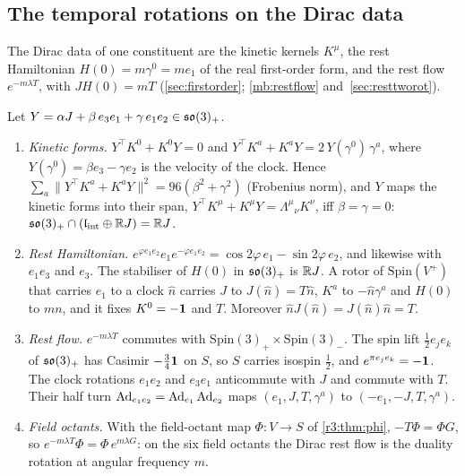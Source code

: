 \subsection{The temporal rotations on the Dirac data}
\label{e6:sec:dirac}

The Dirac data of one constituent are the kinetic kernels $K^\mu$, the rest Hamiltonian $H(0)=m\gamma^0=me_1$ of the real first-order form,
and the rest flow $e^{-m\lambda T}$, with $JH(0)=mT$ (\cref{sec:firstorder}; \cref{mb:restflow} and~\cref{sec:resttworot}).

\begin{proposition}
\label{e6:prop:dirac}
Let $Y=\alpha J+\beta\,e_3e_1+\gamma\,e_1e_2\in\mathfrak{so}(3)_+$.
\begin{enumerate}[label=(\roman*),leftmargin=2.2em]
\item \emph{Kinetic forms.} $Y^{\!\top}K^0+K^0Y=0$ and $Y^{\!\top}K^a+K^aY=2\,Y(\gamma^0)\,\gamma^a$, where $Y(\gamma^0)=\beta e_3-\gamma e_2$ is the velocity
of the clock. Hence $\sum_a\|Y^{\!\top}K^a+K^aY\|^2=96(\beta^2+\gamma^2)$ (Frobenius norm), and $Y$ maps the kinetic forms into their span,
$Y^{\!\top}K^\mu+K^\mu Y=\Lambda^\mu{}_\nu K^\nu$, iff $\beta=\gamma=0$: $\mathfrak{so}(3)_+\cap(\mathfrak l_{\rm int}\oplus\mathbb{R} J)=\mathbb{R} J$.
\item \emph{Rest Hamiltonian.} $e^{\varphi e_1e_2}e_1e^{-\varphi e_1e_2}=\cos2\varphi\,e_1-\sin2\varphi\,e_2$, and likewise with $e_1e_3$ and $e_3$. The stabiliser of
$H(0)$ in $\mathfrak{so}(3)_+$ is $\mathbb{R} J$. A rotor of $\mathrm{Spin}(V^+)$ that carries $e_1$ to a clock $\hat n$ carries $J$ to $J(\hat n)=T\hat n$, $K^a$ to $-\hat n\gamma^a$ and
$H(0)$ to $mn$, and it fixes $K^0=-\mathbf 1$ and $T$. Moreover $\hat nJ(\hat n)=J(\hat n)\hat n=T$.
\item \emph{Rest flow.} $e^{-m\lambda T}$ commutes with $\mathrm{Spin}(3)_+\times\mathrm{Spin}(3)_-$. The spin lift $\tfrac12e_je_k$ of $\mathfrak{so}(3)_+$ has Casimir
$-\tfrac34\mathbf 1$ on $S$, so $S$ carries isospin $\tfrac12$, and $e^{\pi e_je_k}=-\mathbf 1$. The clock rotations $e_1e_2$ and $e_3e_1$ anticommute with $J$ and commute
with $T$. Their half turn $\operatorname{Ad}_{e_1e_2}=\operatorname{Ad}_{e_1}\operatorname{Ad}_{e_2}$ maps $(e_1,J,T,\gamma^a)$ to $(-e_1,-J,T,\gamma^a)$.
\item \emph{Field octants.} With the field-octant map $\Phi\colon V\to S$ of \cref{r3:thm:phi}, $-T\Phi=\Phi G$, so
$e^{-m\lambda T}\Phi=\Phi\,e^{m\lambda G}$: on the six field octants the Dirac rest flow is the duality rotation at angular frequency $m$.
\end{enumerate}
\end{proposition}

